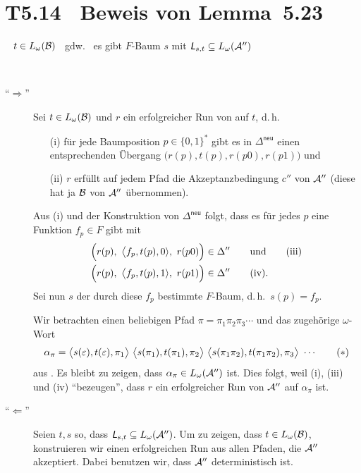 \documentclass[fontsize=11pt, twoside=false, numbers=autoenddot]{scrbook}
\begin{document}
\goodbreak
\section*{T5.14~ Beweis von Lemma~5.23}

~
$t \in L_\omega(\mathcal{B})$
~gdw.~
es gibt $F$-Baum $s$ mit $\textsf{\textit{L}}_{s,t} \subseteq L_\omega(\mathcal{A}'')$

\par\medskip
{}~
\begin{description}
  \item[{\boldmath"`$\Rightarrow$"'}]
    Sei $t \in L_\omega(\mathcal{B})$ und $r$ ein erfolgreicher Run von \Bmc auf $t$,
    d.\,h.
    \begin{itemize}
      \item[(i)] 
        für jede Baumposition $p \in \{0,1\}^*$ gibt es in $\Delta^{\textsf{neu}}$
        einen entsprechenden Übergang $\big(r(p),t(p),r(p0),r(p1)\big)$ \qquad und
      \item[(ii)]
        $r$ erfüllt auf jedem Pfad die Akzeptanzbedingung
        $c''$ von $\mathcal{A}''$ (diese hat ja $\mathcal{B}$ von $\mathcal{A}''$ übernommen).
    \end{itemize}
    Aus (i) und der Konstruktion von $\Delta^{\textsf{neu}}$ folgt,
    dass es für jedes $p$ eine Funktion $f_p \in F$ gibt mit
    \begin{align*}
      \Big(r(p),~ \big\langle f_p,t(p),0\rangle,~ r(p0)\Big) & \in \Delta''\qquad\text{und} \tag{iii}\\
      \Big(r(p),~ \big\langle f_p,t(p),1\rangle,~ r(p1)\Big) & \in \Delta'' \tag{iv}.
    \end{align*}
    Sei nun $s$ der durch diese $f_p$ bestimmte $F$-Baum,
    d.\,h.\ $s(p) = f_p$.
    
    Wir betrachten einen beliebigen Pfad $\pi = \pi_1\pi_2\pi_3\cdots$
    und das zugehörige $\omega$-Wort
    \[
      \alpha_\pi = 
      \big\langle s(\varepsilon),t(\varepsilon),\pi_1\big\rangle~
      \big\langle s(\pi_1),t(\pi_1),\pi_2\big\rangle~
      \big\langle s(\pi_1\pi_2),t(\pi_1\pi_2),\pi_3\big\rangle~
      \cdots
      \tag{$*$}
    \]
    aus \Lst.
    Es bleibt zu zeigen, dass $\alpha_\pi \in L_\omega(\mathcal{A}'')$ ist.
    Dies folgt, weil (i), (iii) und (iv) "`bezeugen"', dass $r$
    ein erfolgreicher Run von $\mathcal{A}''$ auf $\alpha_\pi$ ist.
    \par\medskip
  \item[{\boldmath"`$\Leftarrow$"'}]
    Seien $t,s$ so, dass $\textsf{\textit{L}}_{s,t} \subseteq L_\omega(\mathcal{A}'')$.
    Um zu zeigen, dass $t \in L_\omega(\mathcal{B})$, konstruieren wir einen
    erfolgreichen Run aus allen Pfaden, die $\mathcal{A}''$ akzeptiert.
    Dabei benutzen wir, dass $\mathcal{A}''$ deterministisch ist.
    

\end{description}
\end{document}
